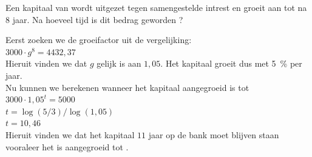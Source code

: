 \begin{oef}
Een kapitaal van  wordt uitgezet tegen samengestelde intrest
   en groeit aan tot  na 8 jaar. Na hoeveel tijd is dit bedrag
    geworden ?
   \begin{opl}
Eerst zoeken we de groeifactor uit de vergelijking:\\
$3000\cdot g^{8} = 4432,37$\\
Hieruit vinden we dat $g$ gelijk is aan $1,05$. Het kapitaal groeit dus met \SI{5}{\percent} per jaar.\\
Nu kunnen we berekenen wanneer het kapitaal aangegroeid is tot \\
$3000\cdot 1,05^{t} = 5000$\\
$t = \log(5/3)/\log(1,05)$\\
$t = 10,46$\\
Hieruit vinden we dat het kapitaal $11$ jaar op de bank moet blijven staan vooraleer het is aangegroeid tot .
   
   \end{opl}
\end{oef}
  

%
%
%


